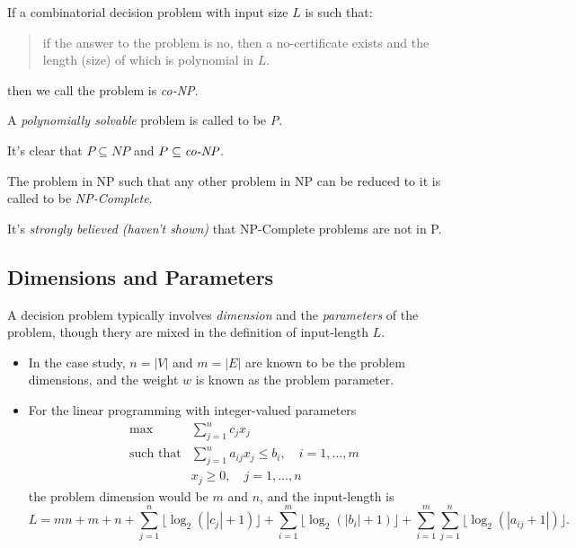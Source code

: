 \begin{definition}[co-NP problem]
If a combinatorial decision problem with input size $L$ is such that:
\begin{quotation}
if the answer to the problem is no, then a no-certificate exists and the length (size) of which is polynomial in $L$.
\end{quotation}
then we call the problem is \emph{co-NP}.
\end{definition}

\begin{definition}[P problem]
A \emph{polynomially solvable} problem is called to be \emph{P}.
\end{definition}

It's clear that $P\subseteq NP$ and $P\subseteq \emph{co-NP}$. 

\begin{definition}
The problem in NP such that any other problem in NP can be reduced to it is called to be \emph{NP-Complete}.
\end{definition}

It's \emph{strongly believed (haven't shown)} that NP-Complete problems are not in P.

\subsection{Dimensions and Parameters}

A decision problem typically involves \emph{dimension} and the \emph{parameters} of the problem, though thery are mixed in the definition of input-length $L$.
\begin{itemize}
\item
In the case study, $n=|V|$ and $m = |E|$ are known to be the problem dimensions, and the weight $w$ is known as the problem parameter.
\item
For the linear programming with integer-valued parameters
\[
\begin{array}{ll}
\max&\sum_{j=1}^nc_jx_j\\
\mbox{such that}&\sum_{j=1}^na_{ij}x_j\le b_i,\quad i=1,\dots,m\\
&x_j\ge0,\quad j=1,\dots,n
\end{array}
\]
the problem dimension would be $m$ and $n$, and the input-length is
\[
L = mn+m+n+\sum_{j=1}^n\lfloor
\log_2(|c_{j}|+1)
\rfloor
+
\sum_{i=1}^m\lfloor
\log_2(|b_i|+1)
\rfloor
+
\sum_{i=1}^m\sum_{j=1}^n\lfloor
\log_2(|a_{ij}+1|)
\rfloor.
\]
\end{itemize}


